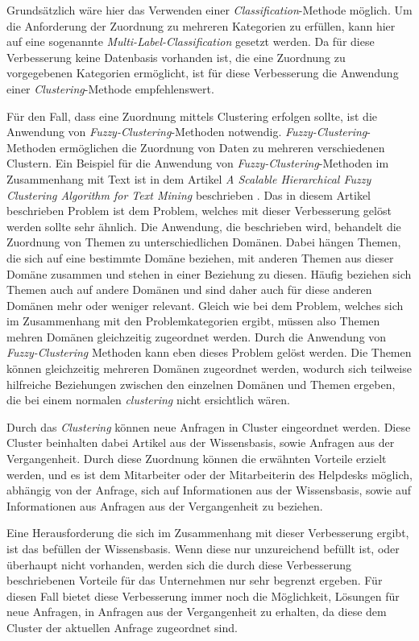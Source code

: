 Grundsätzlich wäre hier das Verwenden einer \textit{Classification}-Methode möglich. Um die Anforderung der Zuordnung zu mehreren Kategorien zu erfüllen, kann hier auf eine sogenannte \textit{Multi-Label-Classification} gesetzt werden. Da für diese Verbesserung keine Datenbasis vorhanden ist, die eine Zuordnung zu vorgegebenen Kategorien ermöglicht, ist für diese Verbesserung die Anwendung einer \textit{Clustering}-Methode empfehlenswert.

Für den Fall, dass eine Zuordnung mittels Clustering erfolgen sollte, ist die Anwendung von \textit{Fuzzy-Clustering}-Methoden notwendig. \textit{Fuzzy-Clustering}-Methoden ermöglichen die Zuordnung von Daten zu mehreren verschiedenen Clustern. Ein Beispiel für die Anwendung von \textit{Fuzzy-Clustering}-Methoden im Zusammenhang mit Text ist in dem Artikel \textit{A Scalable Hierarchical Fuzzy Clustering Algorithm for Text Mining} beschrieben \cite{rodrigues2004scalable}. Das in diesem Artikel beschrieben Problem ist dem Problem, welches mit dieser Verbesserung gelöst werden sollte sehr ähnlich. Die Anwendung, die beschrieben wird, behandelt die Zuordnung von Themen zu unterschiedlichen Domänen. Dabei hängen Themen, die sich auf eine bestimmte Domäne beziehen, mit anderen Themen aus dieser Domäne zusammen und stehen in einer Beziehung zu diesen. Häufig beziehen sich Themen auch auf andere Domänen und sind daher auch für diese anderen Domänen mehr oder weniger relevant. Gleich wie bei dem Problem, welches sich im Zusammenhang mit den Problemkategorien ergibt, müssen also Themen mehren Domänen gleichzeitig zugeordnet werden. Durch die Anwendung von \textit{Fuzzy-Clustering} Methoden kann eben dieses Problem gelöst werden. Die Themen können gleichzeitig mehreren Domänen zugeordnet werden, wodurch sich teilweise hilfreiche Beziehungen zwischen den einzelnen Domänen und Themen ergeben, die bei einem normalen \textit{clustering} nicht ersichtlich wären.

Durch das \textit{Clustering} können neue Anfragen in Cluster eingeordnet werden. Diese Cluster beinhalten dabei Artikel aus der Wissensbasis, sowie Anfragen aus der Vergangenheit. Durch diese Zuordnung können die erwähnten Vorteile erzielt werden, und es ist dem Mitarbeiter oder der Mitarbeiterin des Helpdesks möglich, abhängig von der Anfrage, sich auf Informationen aus der Wissensbasis, sowie auf Informationen aus Anfragen aus der Vergangenheit zu beziehen.

Eine Herausforderung die sich im Zusammenhang mit dieser Verbesserung ergibt, ist das befüllen der Wissensbasis. Wenn diese nur unzureichend befüllt ist, oder überhaupt nicht vorhanden, werden sich die durch diese Verbesserung beschriebenen Vorteile für das Unternehmen nur sehr begrenzt ergeben. Für diesen Fall bietet diese Verbesserung immer noch die Möglichkeit, Lösungen für neue Anfragen, in Anfragen aus der Vergangenheit zu erhalten, da diese dem Cluster der aktuellen Anfrage zugeordnet sind.

